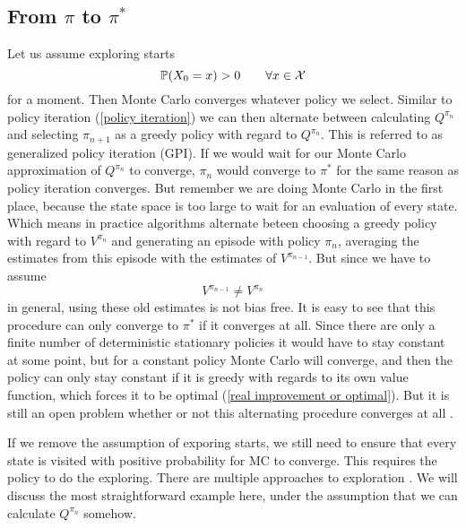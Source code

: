 \subsection{From \(\pi\) to \(\pi^*\)}
Let us assume exploring starts 
\[
	\mathbb{P}(X_0=x)>0 \qquad \forall x\in\mathcal{X}
\] 
for a moment. Then Monte Carlo converges whatever policy we select. Similar to policy iteration (\ref{policy iteration}) we can then alternate between calculating \(Q^{\pi_n}\) and selecting \(\pi_{n+1}\) as a greedy policy with regard to \(Q^{\pi_n}\). This is referred to as generalized policy iteration (GPI). If we would wait for our Monte Carlo approximation of \(Q^{\pi_n}\) to converge, \(\pi_n\) would converge to \(\pi^*\) for the same reason as policy iteration converges. But remember we are doing Monte Carlo in the first place, because the state space is too large to wait for an evaluation of every state. Which means in practice algorithms alternate beteen choosing a greedy policy with regard to \({V^{\pi_n}}\) and generating an episode with policy \(\pi_n\), averaging the estimates from this episode with the estimates of \(V^{\pi_{n-1}}\). But since we have to assume
\[
	V^{\pi_{n-1}}\neq V^{\pi_n}
\] 
in general, using these old estimates is not bias free. It is easy to see that this procedure can only converge to \(\pi^*\) if it converges at all. Since there are only a finite number of deterministic stationary policies it would have to stay constant at some point, but for a constant policy Monte Carlo will converge, and then the policy can only stay constant if it is greedy with regards to its own value function, which forces it to be optimal (\ref{real improvement or optimal}). But it is still an open problem whether or not this alternating procedure converges at all \parencite[99]{suttonReinforcementLearningIntroduction2018a}.

If we remove the assumption of exporing starts, we still need to ensure that every state is visited with positive probability for MC to converge. This requires the policy to do the exploring. There are multiple approaches to exploration . We will discuss the most straightforward example here, under the assumption that we can calculate \(Q^{\pi_n}\) somehow.  

